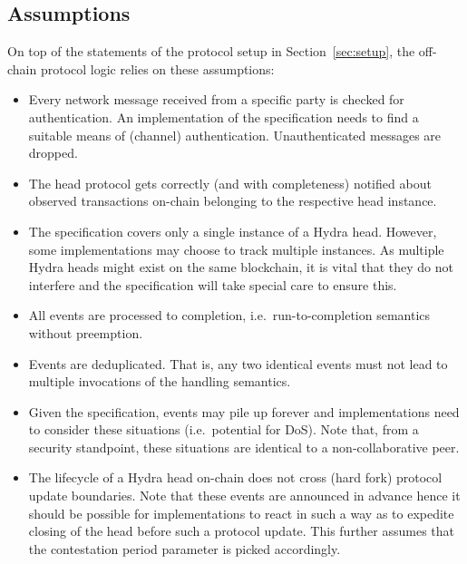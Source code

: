 \subsection{Assumptions}

On top of the statements of the protocol setup in Section~\ref{sec:setup}, the
off-chain protocol logic relies on these assumptions:
\begin{itemize}
  \item Every network message received from a specific party is checked for
        authentication. An implementation of the specification needs to find a
        suitable means of (channel) authentication. Unauthenticated messages are
        dropped.
  \item The head protocol gets correctly (and with completeness) notified about
        observed transactions on-chain belonging to the respective head
        instance.
  \item The specification covers only a single instance of a Hydra head.
        However, some implementations may choose to track multiple instances. As
        multiple Hydra heads might exist on the same blockchain, it is vital
        that they do not interfere and the specification will take special care
        to ensure this.
  \item All events are processed to completion, i.e.\ run-to-completion semantics
        without preemption.
  \item Events are deduplicated. That is, any two identical events must not lead
        to multiple invocations of the handling semantics.
  \item Given the specification, events may pile up forever and implementations
        need to consider these situations (i.e.\ potential for DoS). Note that,
        from a security standpoint, these situations are identical to a
        non-collaborative peer.
  \item The lifecycle of a Hydra head on-chain does not cross (hard fork)
        protocol update boundaries. Note that these events are announced in
        advance hence it should be possible for implementations to react in such
        a way as to expedite closing of the head before such a protocol update.
        This further assumes that the contestation period parameter is picked
        accordingly.
\end{itemize}

